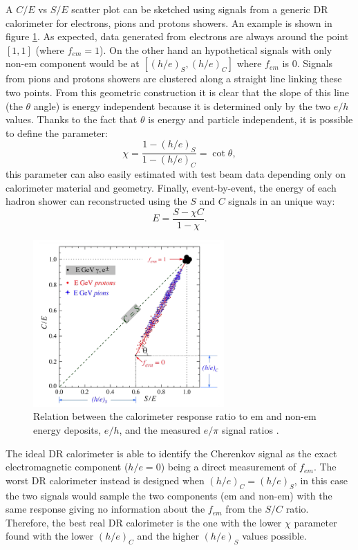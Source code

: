 A $C/E$ vs $S/E$ scatter plot can be sketched using signals from a generic DR calorimeter for electrons, pions and protons showers. An example is shown in figure \ref{fig:theta_DR}. As expected, data generated from electrons are always around the point $[1,1]$ (where $f_{em} = 1$). On the other hand an hypothetical signals with only non-em component would be at $[(h/e)_S,(h/e)_C]$ where $f_{em}$ is $0$. Signals from pions and protons showers are clustered along a straight line linking these two points. From this geometric construction it is clear that the slope of this line (the $\theta$ angle) is energy independent because it is determined only by the two $e/h$ values. Thanks to the fact that $\theta$ is energy and particle independent, it is possible to define the parameter:
\begin{equation}
    \chi = \frac{1-(h/e)_S}{1-(h/e)_C} = \cot{\theta},
\end{equation}
this parameter can also easily estimated with test beam data depending only on calorimeter material and geometry.
Finally, event-by-event, the energy of each hadron shower can reconstructed  using the $S$ and $C$ signals in an unique way:
\begin{equation}
    E = \frac{S - \chi C}{1 - \chi}.
\end{equation}

\begin{figure}
	\centering
	\includegraphics[width=0.65\textwidth]{IMG/Cap2/theta_DR.png}
	\caption{Relation between the calorimeter response ratio to em and non-em energy deposits, $e/h$, and the measured $e/\pi$ signal ratios \cite{DR_Theta}.}
	\label{fig:theta_DR}
\end{figure}

The ideal DR calorimeter is able to identify the Cherenkov signal as the exact electromagnetic component ($h/e = 0$) being a direct measurement of $f_{em}$. The worst DR calorimeter instead is designed when $(h/e)_C = (h/e)_S$, in this case the two signals would sample the two components (em and non-em) with the same response giving no information about the $f_{em}$ from the $S/C$ ratio.  Therefore, the best real DR calorimeter is the one with the lower $\chi$ parameter found with the lower $(h/e)_C$ and the higher $(h/e)_S$ values possible. 

